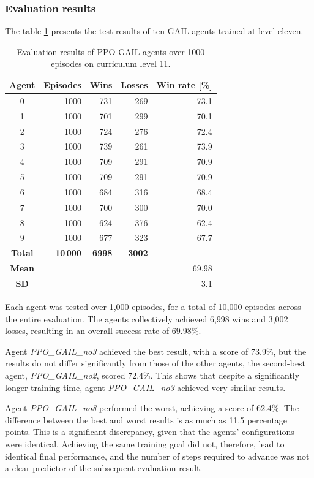 \subsubsection{Evaluation results}
The table \ref{tab:gail_evaluation_results} presents the test results of ten GAIL agents trained at level eleven.
\begin{table}[H]
	\centering
	\caption{Evaluation results of PPO GAIL agents over 1000 episodes on curriculum level 11.}
	\label{tab:gail_evaluation_results}
	\begin{tabular}{c r r r r}
		\toprule
		\textbf{Agent} &
		\textbf{Episodes} &
		\textbf{Wins} &
		\textbf{Losses} &
		\textbf{Win rate [\%]} \\
		\midrule
		0 & 1000 & 731 & 269 & 73.1 \\
		1 & 1000 & 701 & 299 & 70.1 \\
		2 & 1000 & 724 & 276 & 72.4 \\
		3 & 1000 & 739 & 261 & 73.9 \\
		4 & 1000 & 709 & 291 & 70.9 \\
		5 & 1000 & 709 & 291 & 70.9 \\
		6 & 1000 & 684 & 316 & 68.4 \\
		7 & 1000 & 700 & 300 & 70.0 \\
		8 & 1000 & 624 & 376 & 62.4 \\
		9 & 1000 & 677 & 323 & 67.7 \\
		\midrule
		\textbf{Total} &
		\textbf{10\,000} &
		\textbf{6998} &
		\textbf{3002} &
		\textbf{} \\
		\textbf{Mean} &
		&
		&
		&
		69.98 \\
		\textbf{SD} &
		&
		&
		&
		3.1 \\
		\bottomrule
	\end{tabular}
\end{table}
Each agent was tested over 1,000 episodes, for a total of 10,000 episodes across the entire evaluation. The agents collectively achieved 6,998 wins and 3,002 losses, resulting in an overall success rate of 69.98\%.

Agent \textit{PPO\_GAIL\_no3} achieved the best result, with a score of 73.9\%, but the results do not differ significantly from those of the other agents, the second-best agent, \textit{PPO\_GAIL\_no2}, scored 72.4\%. This shows that despite a significantly longer training time, agent \textit{PPO\_GAIL\_no3} achieved very similar results.

Agent \textit{PPO\_GAIL\_no8} performed the worst, achieving a score of 62.4\%. The difference between the best and worst results is as much as 11.5 percentage points. This is a significant discrepancy, given that the agents’ configurations were identical. Achieving the same training goal did not, therefore, lead to identical final performance, and the number of steps required to advance was not a clear predictor of the subsequent evaluation result.
